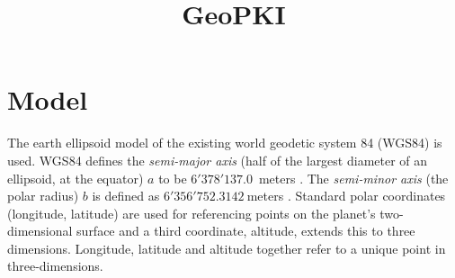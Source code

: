 \documentclass[10pt,conference,compsocconf]{IEEEtran}
\title{\Large GeoPKI \vspace{-1.1em}}
\date{}
\begin{document}
\makeatletter
\@twocolumnfalse
\maketitle
\@twocolumntrue
\makeatother




\section{Model}
\label{sec:model}

The earth ellipsoid model of the existing world geodetic system 84 (WGS84) \cite{noauthor_nga_nodate} is used.
WGS84 defines the \emph{semi-major axis} (half of the largest diameter of an ellipsoid, at the equator) $a$ to be $6'378'137.0$~meters \cite{noauthor_nga_nodate}. The \emph{semi-minor axis} (the polar radius) $b$ is defined as $6'356'752.3142~$meters \cite{noauthor_nga_nodate}.
Standard polar coordinates (longitude, latitude) are used for referencing points on the planet's two-dimensional surface and a third coordinate, altitude, extends this to three dimensions.
Longitude, latitude and altitude together refer to a unique point in three-dimensions.
\end{document}
